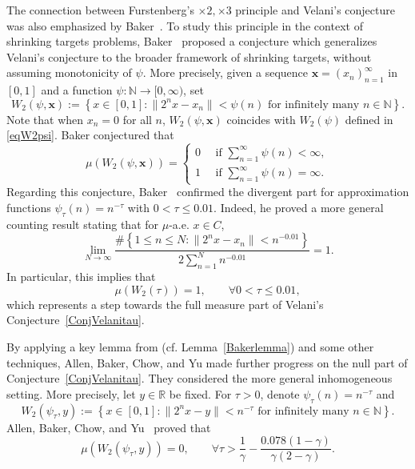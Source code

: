 \documentclass[amssymb,amsfonts,refcheck,12pt,verbatim,righttag]{amsart}
\numberwithin{equation}{section} %
\newcommand{\R}{\mathbb{R}}
\newcommand{\N}{\mathbb{N}}
\theoremstyle{plain}
\begin{document}
The connection between Furstenberg's $\times 2, \times 3$ principle and Velani's conjecture  was also emphasized by Baker~\cite{Baker25A}.
To  study  this principle in the context of shrinking targets problems, 
Baker~\cite{Baker25A} proposed a  conjecture which generalizes Velani's conjecture to the  broader framework of shrinking targets, without assuming monotonicity of $\psi$. More precisely,
given a sequence  $\mathbf{x}=(x_n)_{n=1}^{\infty}$ in $[0,1]$ and a function $\psi:\N\to[0,\infty)$, set
\[W_2(\psi,\mathbf{x}):=\left\{x\in[0,1]: \|2^nx-x_n\|<\psi(n)\text{ for infinitely many }n\in \N\right\}.\]
Note that when $x_n=0$ for all $n$, $W_2(\psi,\mathbf{x})$ coincides with $W_2(\psi)$ defined in \eqref{eqW2psi}.
Baker conjectured that 
\begin{equation}\label{BakerConj}
\mu(W_2(\psi,\mathbf{x}))=\begin{cases}
	0 \quad  \text{ if }\sum_{n=1}^{\infty}\psi(n)<\infty,\\
	1 \quad \text{ if }\sum_{n=1}^{\infty}\psi(n)=\infty.
\end{cases}
\end{equation}
Regarding this conjecture, Baker~\cite{Baker25A} confirmed the divergent part for approximation functions $\psi_{\tau}(n)=n^{-\tau}$ with $0<\tau\leq 0.01$. Indeed, he proved a more general counting result stating that for $\mu$-a.e. $x\in C$, 
\begin{equation}\label{BakerMainthm}
\lim_{N\to\infty}\frac{\#\left\{1\leq n\leq  N:\|2^nx-x_n\|<n^{-0.01}\right\}}{2\sum_{n=1}^{N}n^{-0.01}}=1.
\end{equation}
In particular, this implies that
\begin{equation}\label{eqBaker001}
\mu(W_2(\tau))=1, \qquad \forall 0<\tau\leq 0.01,
\end{equation}
which represents a step towards the full measure part of Velani's Conjecture~\ref{ConjVelanitau}.

By applying a key lemma from \cite{Baker25A} (cf. Lemma~\ref{Bakerlemma})  and some other techniques,  
Allen, Baker, Chow, and Yu \cite{ABCY23A} made further progress on the null part of Conjecture~\ref{ConjVelanitau}. They considered the more general inhomogeneous setting. More precisely, let $y\in \R$ be fixed. 
For $\tau>0$, denote $\psi_{\tau}(n)=n^{-\tau}$ and
\begin{equation}\label{eqW2tauy}
 W_{2}(\psi_{\tau},y):=\left\{x\in[0,1]: \|2^{n}x-y\|<n^{-\tau}\text{ for infinitely many } n\in\mathbb{N}\right\}. 
\end{equation}
Allen, Baker, Chow, and Yu~\cite{ABCY23A} proved that 
\begin{equation}\label{ThmABCYCon}
\mu(W_2(\psi_{\tau}, y)) = 0, \qquad  \forall \tau>\frac{1}{\gamma}-\frac{0.078(1-\gamma)}{\gamma(2-\gamma)}.
\end{equation}
\end{document}
